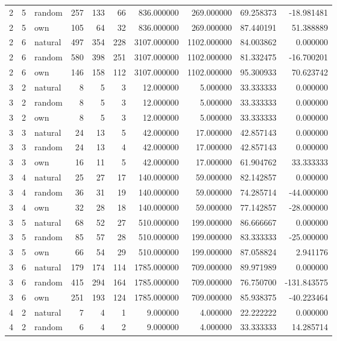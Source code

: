 \begin{table}[htbp]
\begin{tabular}{rrlrrrrrrr}
2 & 5 & random & 257 & 133 & 66 & 836.000000 & 269.000000 & 69.258373 & -18.981481 \\
2 & 5 & own & 105 & 64 & 32 & 836.000000 & 269.000000 & 87.440191 & 51.388889 \\
2 & 6 & natural & 497 & 354 & 228 & 3107.000000 & 1102.000000 & 84.003862 & 0.000000 \\
2 & 6 & random & 580 & 398 & 251 & 3107.000000 & 1102.000000 & 81.332475 & -16.700201 \\
2 & 6 & own & 146 & 158 & 112 & 3107.000000 & 1102.000000 & 95.300933 & 70.623742 \\
3 & 2 & natural & 8 & 5 & 3 & 12.000000 & 5.000000 & 33.333333 & 0.000000 \\
3 & 2 & random & 8 & 5 & 3 & 12.000000 & 5.000000 & 33.333333 & 0.000000 \\
3 & 2 & own & 8 & 5 & 3 & 12.000000 & 5.000000 & 33.333333 & 0.000000 \\
3 & 3 & natural & 24 & 13 & 5 & 42.000000 & 17.000000 & 42.857143 & 0.000000 \\
3 & 3 & random & 24 & 13 & 4 & 42.000000 & 17.000000 & 42.857143 & 0.000000 \\
3 & 3 & own & 16 & 11 & 5 & 42.000000 & 17.000000 & 61.904762 & 33.333333 \\
3 & 4 & natural & 25 & 27 & 17 & 140.000000 & 59.000000 & 82.142857 & 0.000000 \\
3 & 4 & random & 36 & 31 & 19 & 140.000000 & 59.000000 & 74.285714 & -44.000000 \\
3 & 4 & own & 32 & 28 & 18 & 140.000000 & 59.000000 & 77.142857 & -28.000000 \\
3 & 5 & natural & 68 & 52 & 27 & 510.000000 & 199.000000 & 86.666667 & 0.000000 \\
3 & 5 & random & 85 & 57 & 28 & 510.000000 & 199.000000 & 83.333333 & -25.000000 \\
3 & 5 & own & 66 & 54 & 29 & 510.000000 & 199.000000 & 87.058824 & 2.941176 \\
3 & 6 & natural & 179 & 174 & 114 & 1785.000000 & 709.000000 & 89.971989 & 0.000000 \\
3 & 6 & random & 415 & 294 & 164 & 1785.000000 & 709.000000 & 76.750700 & -131.843575 \\
3 & 6 & own & 251 & 193 & 124 & 1785.000000 & 709.000000 & 85.938375 & -40.223464 \\
4 & 2 & natural & 7 & 4 & 1 & 9.000000 & 4.000000 & 22.222222 & 0.000000 \\
4 & 2 & random & 6 & 4 & 2 & 9.000000 & 4.000000 & 33.333333 & 14.285714 \\

\end{tabular}
\end{table}
